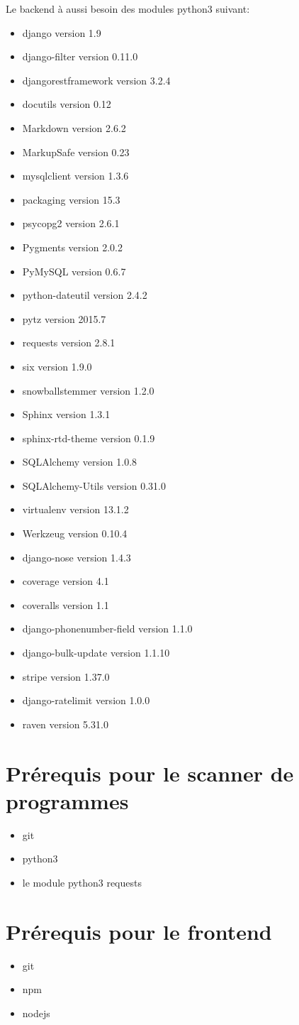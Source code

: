 Le backend à aussi besoin des modules python3 suivant:
\begin{itemize}
\item django version 1.9
\item django-filter version 0.11.0
\item djangorestframework version 3.2.4
\item docutils version 0.12
\item Markdown version 2.6.2
\item MarkupSafe version 0.23
\item mysqlclient version 1.3.6
\item packaging version 15.3
\item psycopg2 version 2.6.1
\item Pygments version 2.0.2
\item PyMySQL version 0.6.7
\item python-dateutil version 2.4.2
\item pytz version 2015.7
\item requests version 2.8.1
\item six version 1.9.0
\item snowballstemmer version 1.2.0
\item Sphinx version 1.3.1
\item sphinx-rtd-theme version 0.1.9
\item SQLAlchemy version 1.0.8
\item SQLAlchemy-Utils version 0.31.0
\item virtualenv version 13.1.2
\item Werkzeug version 0.10.4
\item django-nose version 1.4.3
\item coverage version 4.1
\item coveralls version 1.1
\item django-phonenumber-field version 1.1.0
\item django-bulk-update version 1.1.10
\item stripe version 1.37.0
\item django-ratelimit version 1.0.0
\item raven version 5.31.0
\end{itemize}


\section{Prérequis pour le scanner de programmes}
\begin{itemize}
\item git
\item python3
\item le module python3 requests
\end{itemize}

\section{Prérequis pour le frontend}
\begin{itemize}
\item git
\item npm
\item nodejs
\end{itemize}
